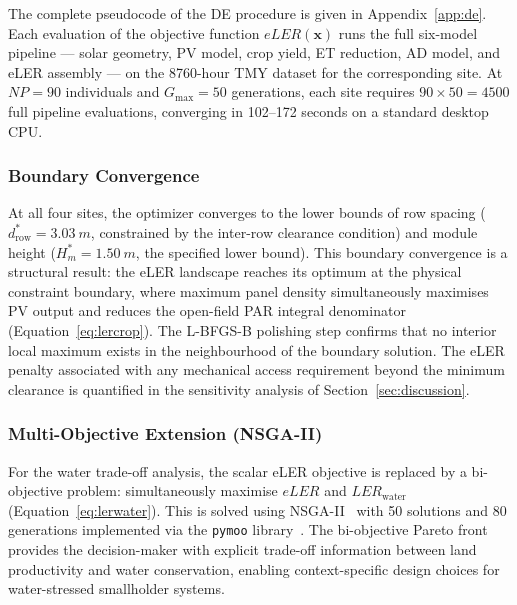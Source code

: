 The complete pseudocode of the DE procedure is given in
Appendix~\ref{app:de}. Each evaluation of the objective function
$eLER(\mathbf{x})$ runs the full six-model pipeline --- solar
geometry, PV model, crop yield, ET reduction, AD model, and eLER
assembly --- on the 8760-hour TMY dataset for the corresponding
site. At $NP = 90$ individuals and $G_{\max} = 50$ generations,
each site requires $90 \times 50 = 4500$ full pipeline evaluations,
converging in 102--172 seconds on a standard desktop CPU.

\subsubsection{Boundary Convergence}
\label{sec:boundaryconv}

\hspace{1cm}At all four sites, the optimizer converges to the
lower bounds of row spacing ($d_{\text{row}}^* = \SI{3.03}{m}$,
constrained by the inter-row clearance condition) and module
height ($H_m^* = \SI{1.50}{m}$, the specified lower bound).
This boundary convergence is a structural result: the eLER
landscape reaches its optimum at the physical constraint boundary,
where maximum panel density simultaneously maximises
PV output and reduces the open-field PAR integral denominator
(Equation~\ref{eq:lercrop}). The L-BFGS-B polishing step
confirms that no interior local maximum exists in the neighbourhood
of the boundary solution. The eLER penalty associated with any
mechanical access requirement beyond the minimum clearance is
quantified in the sensitivity analysis of
Section~\ref{sec:discussion}.

\subsubsection{Multi-Objective Extension (NSGA-II)}

\hspace{1cm}For the water trade-off analysis, the scalar eLER
objective is replaced by a bi-objective problem: simultaneously
maximise $eLER$ and $LER_{\text{water}}$ (Equation~\ref{eq:lerwater}).
This is solved using NSGA-II~\citep{blank2020} with 50 solutions
and 80 generations implemented via the \texttt{pymoo}
library~\citep{blank2020}. The bi-objective Pareto front provides
the decision-maker with explicit trade-off information between
land productivity and water conservation, enabling context-specific
design choices for water-stressed smallholder systems.


